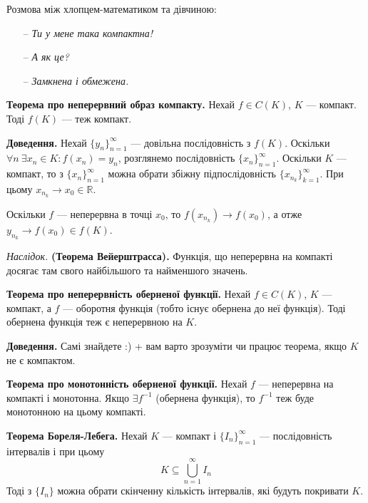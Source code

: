 \documentclass[12pt]{report}
\begin{document}
Розмова між хлопцем-математиком та дівчиною:
\begin{itemize}
    \item[--] \textit{Ти у мене така компактна!}
    \item[--] \textit{А як це?}
    \item[--] \textit{Замкнена і обмежена.}
\end{itemize}

\vspace{5mm}

\textbf{Теорема про неперервний образ компакту.} Нехай $f \in C(K)$, $K$ --- компакт. Тоді $f(K)$ --- теж компакт.

\textbf{Доведення.} Нехай $\{ y_n\}_{n=1}^{\infty}$ --- довільна послідовність з $f(K)$. Оскільки $\forall n\ \exists x_n \in K : f(x_n) = y_n$, розглянемо послідовність $\{ x_n\}_{n=1}^{\infty}$.  Оскільки $K$ --- компакт, то з $\{ x_n\}_{n=1}^{\infty}$ можна обрати збіжну підпослідовність $\{ x_{n_k}\}_{k=1}^{\infty}$. При цьому $x_{n_k} \to x_0 \in \mathbb{R}$.

Оскільки $f$ --- неперервна в точці $x_0$, то $f(x_{n_k}) \to f(x_0)$, а отже $y_{n_k} \to f(x_0) \in f(K)$.

\vspace{3mm}

\textit{Наслідок.} \textbf{(Теорема Вейерштрасса).} Функція, що неперервна на компакті досягає там свого найбільшого та найменшого значень.

\vspace{5mm}

\textbf{Теорема про неперервність оберненої функції.} Нехай $f \in C( K)$, $K$ --- компакт, а $f$ --- оборотня функція (тобто існує обернена до неї функція). Тоді обернена функція теж є неперервною на $K$.

\textbf{Доведення.} Самі знайдете :) + вам варто зрозуміти чи працює теорема, якщо $K$ не є компактом.

\vspace{5mm}

\textbf{Теорема про монотонність оберненої функції.} Нехай $f$ --- неперервна на компакті і монотонна. Якщо $\exists f^{-1}$ (обернена функція), то $f^{-1}$ теж буде монотонною на цьому компакті.

\vspace{5mm}

\textbf{Теорема Бореля-Лебега.} Нехай $K$ --- компакт і $\{ I_n\}_{n=1}^{\infty}$ --- послідовність інтервалів і при цьому 
$$K \subseteq \bigcup\limits_{n=1}^{\infty} I_n$$ 
Тоді з $\{ I_n \}$ можна обрати скінченну кількість інтервалів, які будуть покривати $K$. 
\end{document}
